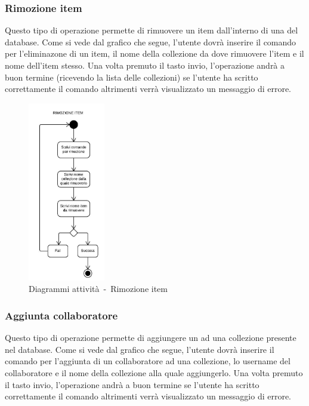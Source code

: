 \documentclass{scalatekids-article}
\begin{document}
\subsubsection{Rimozione item}

Questo tipo di operazione permette di rimuovere un item dall'interno di una
 del database. Come si vede dal grafico che segue, l'utente
dovrà inserire il comando per l'eliminazone di un item, il nome della
collezione da dove rimuovere l'item e il nome dell'item stesso. Una volta
premuto il tasto invio, l'operazione andrà a buon termine (ricevendo la lista
delle collezioni) se l'utente ha scritto correttamente il comando altrimenti
verrà visualizzato un messaggio di errore.

\begin{figure}[H]
  \begin{center}
    \includegraphics[width=0.3\textwidth, keepaspectratio]{img/diagrammiAttivita/rimozioneItem.jpeg}
    \caption{Diagrammi attività\ -\ Rimozione item}
  \end{center}
\end{figure}

\subsubsection{Aggiunta collaboratore}

Questo tipo di operazione permette di aggiungere un  ad
una collezione presente nel database. Come si vede dal grafico che segue,
l'utente dovrà inserire il comando per l'aggiunta di un collaboratore ad una
collezione, lo username del collaboratore e il nome della collezione alla
quale aggiungerlo. Una volta premuto il tasto invio, l'operazione andrà a buon
termine se l'utente ha scritto correttamente il comando altrimenti verrà
visualizzato un messaggio di errore.
\end{document}
